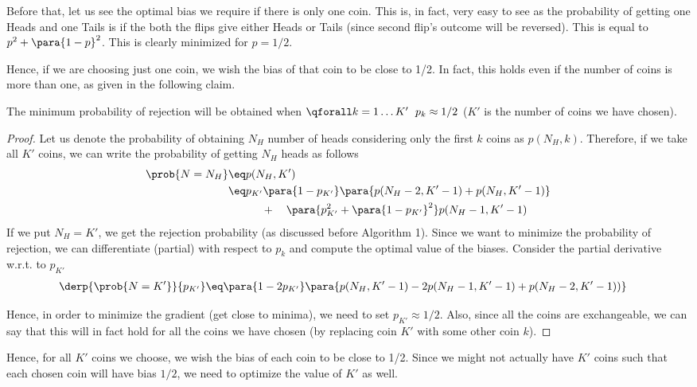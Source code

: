 \documentclass[a4paper,10pt]{article}
\begin{document}
\begin{question}
	Before that, let us see the optimal bias we require if there is only one coin.
	This is, in fact, very easy to see as the probability of getting one Heads and one Tails is if the both the flips give either Heads or Tails (since second flip's outcome will be reversed).
	This is equal to $p^2 + \para{1 - p}^2$.
	This is clearly minimized for $p = 1/2$.

	Hence, if we are choosing just one coin, we wish the bias of that coin to be close to 1/2.
	In fact, this holds even if the number of coins is more than one, as given in the following claim.

	\begin{claim}
		The minimum probability of rejection will be obtained when $\qforall k = 1 \dots K' \;\ p_k \approx 1/2$ ($K'$ is the number of coins we have chosen).
		\begin{proof}
			Let us denote the probability of obtaining $N_H$ number of heads considering only the first $k$ coins as $p(N_H, k)$. Therefore, if we take all $K'$ coins, we can write the probability of getting $N_H$ heads as follows
			\begin{align*}
				\prob{N = N_H}	&\eq	p(N_H, K') \\
				&\eq	p_{K'} \para{1 - p_{K'}} \para{p(N_H - 2, K' - 1) + p(N_H, K' - 1)} \\ &\quad\quad\quad + \quad \para{p_{K'}^2 + \para{1 - p_{K'}}^2} p(N_H - 1, K' - 1)
			\end{align*}
			If we put $N_H = K'$, we get the rejection probability (as discussed before Algorithm 1). Since we want to minimize the probability of rejection, we can differentiate (partial) with respect to $p_{k}$ and compute the optimal value of the biases. Consider the partial derivative w.r.t. to $p_{K'}$
			\begin{align*}
			\derp{\prob{N = K'}}{p_{K'}}	&\eq	\para{1 - 2 p_{K'}} \para{p(N_H, K' - 1) - 2 p(N_H - 1, K' - 1) + p(N_H - 2, K' - 1))}
			\end{align*}

			Hence, in order to minimize the gradient (get close to minima), we need to set $p_{K'} \approx 1/2$.
			Also, since all the coins are exchangeable, we can say that this will in fact hold for all the coins we have chosen (by replacing coin $K'$ with some other coin $k$).
		\end{proof}
	\end{claim}

	Hence, for all $K'$ coins we choose, we wish the bias of each coin to be close to 1/2. Since we might not actually have $K'$ coins such that each chosen coin will have bias $1/2$, we need to optimize the value of $K'$ as well.


\end{question}
\end{document}
